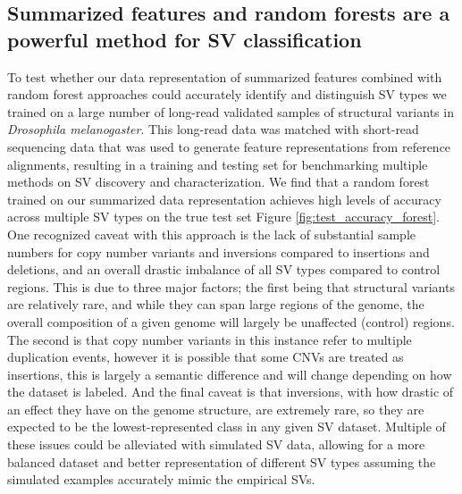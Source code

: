 \subsection{Summarized features and random forests are a powerful method for SV classification}

To test whether our data representation of summarized features combined with random forest approaches could accurately identify and distinguish SV types we trained on a large number of long-read validated samples of structural variants in \textit{Drosophila melanogaster}. This long-read data was matched with short-read sequencing data that was used to generate feature representations from reference alignments, resulting in a training and testing set for benchmarking multiple methods on SV discovery and characterization. We find that a random forest trained on our summarized data representation achieves high levels of accuracy across multiple SV types on the true test set Figure \ref{fig:test_accuracy_forest}. One recognized caveat with this approach is the lack of substantial sample numbers for copy number variants and inversions compared to insertions and deletions, and an overall drastic imbalance of all SV types compared to control regions. This is due to three major factors; the first being that structural variants are relatively rare, and while they can span large regions of the genome, the overall composition of a given genome will largely be unaffected (control) regions. The second is that copy number variants in this instance refer to multiple duplication events, however it is possible that some CNVs are treated as insertions, this is largely a semantic difference and will change depending on how the dataset is labeled. And the final caveat is that inversions, with how drastic of an effect they have on the genome structure, are extremely rare, so they are expected to be the lowest-represented class in any given SV dataset. Multiple of these issues could be alleviated with simulated SV data, allowing for a more balanced dataset and better representation of different SV types assuming the simulated examples accurately mimic the empirical SVs.

